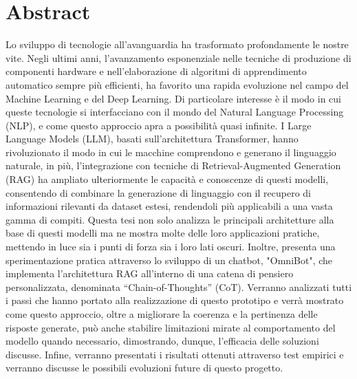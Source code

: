\chapter*{Abstract}
Lo sviluppo di tecnologie all'avanguardia ha trasformato profondamente le nostre vite. Negli ultimi anni, l'avanzamento esponenziale nelle tecniche di produzione di componenti hardware e nell'elaborazione di algoritmi di apprendimento automatico sempre più efficienti, ha favorito una rapida evoluzione nel campo del Machine Learning e del Deep Learning.
Di particolare interesse è il modo in cui queste tecnologie si interfacciano con il mondo del Natural Language Processing (NLP), e come questo approccio apra a possibilità quasi infinite. I Large Language Models (LLM), basati sull'architettura Transformer, hanno rivoluzionato il modo in cui le macchine comprendono e generano il linguaggio naturale, in più, l'integrazione con tecniche di Retrieval-Augmented Generation (RAG) ha ampliato ulteriormente le capacità e conoscenze di questi modelli, consentendo di combinare la generazione di linguaggio con il recupero di informazioni rilevanti da dataset estesi, rendendoli più applicabili a una vasta gamma di compiti.
Questa tesi non solo analizza le principali architetture alla base di questi modelli ma ne mostra molte delle loro applicazioni pratiche, mettendo in luce sia i punti di forza sia i loro lati oscuri. Inoltre, presenta una sperimentazione pratica attraverso lo sviluppo di un chatbot, "OmniBot", che implementa l'architettura RAG all'interno di una catena di pensiero personalizzata, denominata “Chain-of-Thoughts” (CoT). Verranno analizzati tutti i passi che hanno portato alla realizzazione di questo prototipo e verrà mostrato come questo approccio, oltre a migliorare la coerenza e la pertinenza delle risposte generate, può anche stabilire limitazioni mirate al comportamento del modello quando necessario, dimostrando, dunque, l'efficacia delle soluzioni discusse.
Infine, verranno presentati i risultati ottenuti attraverso test empirici e verranno discusse le possibili evoluzioni future di questo progetto.